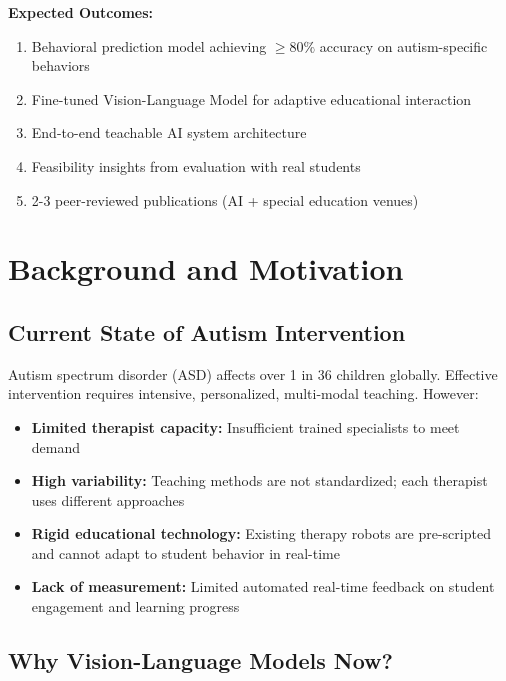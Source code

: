 \documentclass[12pt, a4paper]{article}
\begin{document}
\textbf{Expected Outcomes:}
\begin{enumerate}
    \item Behavioral prediction model achieving $\geq 80\%$ accuracy on autism-specific behaviors
    \item Fine-tuned Vision-Language Model for adaptive educational interaction
    \item End-to-end teachable AI system architecture
    \item Feasibility insights from evaluation with real students
    \item 2-3 peer-reviewed publications (AI + special education venues)
\end{enumerate}

\newpage

\section{Background and Motivation}

\subsection{Current State of Autism Intervention}

Autism spectrum disorder (ASD) affects over 1 in 36 children globally. Effective intervention requires intensive, personalized, multi-modal teaching. However:

\begin{itemize}
    \item \textbf{Limited therapist capacity:} Insufficient trained specialists to meet demand
    \item \textbf{High variability:} Teaching methods are not standardized; each therapist uses different approaches
    \item \textbf{Rigid educational technology:} Existing therapy robots are pre-scripted and cannot adapt to student behavior in real-time
    \item \textbf{Lack of measurement:} Limited automated real-time feedback on student engagement and learning progress
\end{itemize}

\subsection{Why Vision-Language Models Now?}
\end{document}
